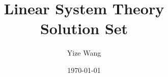 \documentclass[a4paper,12pt]{book}
\begin{document}
\author{Yize Wang}
\title{Linear System Theory\\Solution Set}
\date{\today}

\frontmatter
\maketitle
\tableofcontents

\mainmatter






\backmatter
\end{document}
